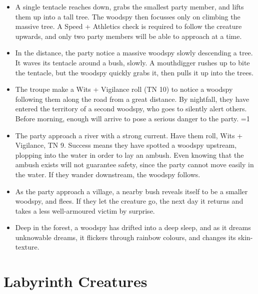 \begin{multicols}{2}
\begin{itemize}
  \item
  A single tentacle reaches down, grabs the smallest party member, and lifts them up into a tall tree.
  The woodspy then focusses only on climbing the massive tree.
  A Speed + Athletics check is required to follow the creature upwards, and only two party members will be able to approach at a time.
  \item
  In the distance, the party notice a massive woodspy slowly descending a tree.
  It waves its tentacle around a bush, slowly.
  A mouthdigger rushes up to bite the tentacle, but the woodspy quickly grabs it, then pulls it up into the trees.
  \item
  The troupe make a Wits + Vigilance roll (TN 10) to notice a woodspy following them along the road from a great distance.
  By nightfall, they have entered the territory of a second woodspy, who goes to silently alert others.
  Before morning, enough will arrive to pose a serious danger to the party.
  \ifodd\value{temperature}=1
    \item
    The party approach a river with a strong current.
    Have them roll, Wits + Vigilance, TN 9.
    Success means they have spotted a woodspy upstream, plopping into the water in order to lay an ambush.
    Even knowing that the ambush exists will not guarantee safety, since the party cannot move easily in the water.
    If they wander downstream, the woodspy follows.
  \else
    \item
    As the party approach a village, a nearby bush reveals itself to be a smaller woodspy, and flees.
    If they let the creature go, the next day it returns and takes a less well-armoured victim by surprise.
    \item
    Deep in the forest, a woodspy has drifted into a deep sleep, and as it dreams unknowable dreams, it flickers through rainbow colours, and changes its skin-texture.
  \fi

\end{itemize}

\end{multicols}

\section[Labyrinth Creatures]{Labyrinth Creatures \A}

